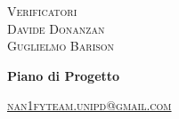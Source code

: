 \documentclass[8pt]{article}
\begin{document}
\begin{titlepage}
\begin{minipage}[t]{0.47\textwidth}
{		}
		\vspace{8mm}
		
		{\large{\textsc{Verificatori}}
			\vspace{3mm}
			{\\\large{\textsc{Davide Donanzan}\\}}
			{\large{\textsc{Guglielmo Barison}}}
			
		}
		\vspace{4mm}\vspace{4mm}
	\end{minipage}
	\vspace{4cm}
	\begin{center}
		\begin{flushright}
			{\fontsize{30pt}{52pt}\selectfont \textbf{Piano di Progetto\\}} %
		\end{flushright}
		\vspace{3cm}
	\end{center}
	\vspace{9cm}
	{\small \textsc{\href{mailto: nan1fyteam.unipd@gmail.com}{\color{black}nan1fyteam.unipd@gmail.com}}}
\end{titlepage}
\pagestyle{mystyle}
\end{document}

